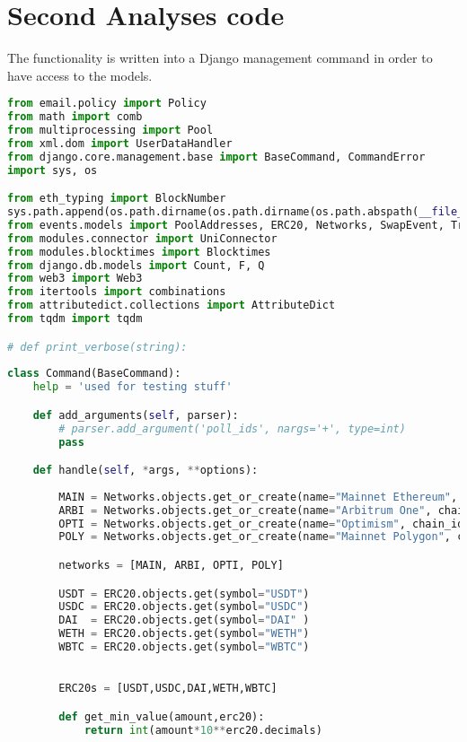 \newpage
\chapter{Second Analyses code}
\label{APP:analysis2}
The functionality is written into a Django management command in order to have access to the models.

\begin{lstlisting}[language=python]
from email.policy import Policy
from math import comb
from multiprocessing import Pool
from xml.dom import UserDataHandler
from django.core.management.base import BaseCommand, CommandError
import sys, os

from eth_typing import BlockNumber
sys.path.append(os.path.dirname(os.path.dirname(os.path.abspath(__file__))))
from events.models import PoolAddresses, ERC20, Networks, SwapEvent, TransactionMeta, BlockTimes
from modules.connector import UniConnector
from modules.blocktimes import Blocktimes
from django.db.models import Count, F, Q
from web3 import Web3
from itertools import combinations
from attributedict.collections import AttributeDict
from tqdm import tqdm

# def print_verbose(string):
    
class Command(BaseCommand):
    help = 'used for testing stuff'

    def add_arguments(self, parser):
        # parser.add_argument('poll_ids', nargs='+', type=int)
        pass

    def handle(self, *args, **options):
        
        MAIN = Networks.objects.get_or_create(name="Mainnet Ethereum", chain_id=1, short="MAIN")[0]
        ARBI = Networks.objects.get_or_create(name="Arbitrum One", chain_id=42161, short="ARBI")[0]
        OPTI = Networks.objects.get_or_create(name="Optimism", chain_id=10, short="OPTI")[0]
        POLY = Networks.objects.get_or_create(name="Mainnet Polygon", chain_id=137, short="POLY")[0]

        networks = [MAIN, ARBI, OPTI, POLY]

        USDT = ERC20.objects.get(symbol="USDT")
        USDC = ERC20.objects.get(symbol="USDC")
        DAI  = ERC20.objects.get(symbol="DAI" )
        WETH = ERC20.objects.get(symbol="WETH")
        WBTC = ERC20.objects.get(symbol="WBTC")
        

        ERC20s = [USDT,USDC,DAI,WETH,WBTC]

        def get_min_value(amount,erc20):
            return int(amount*10**erc20.decimals)
        

\end{lstlisting}
